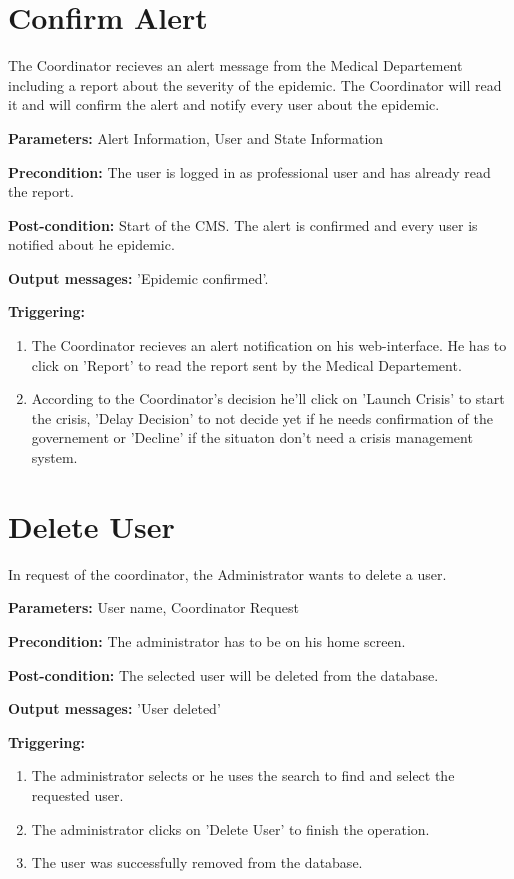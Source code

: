 \section{Confirm Alert}
\label{operation:ConfirmAlert}
The Coordinator recieves an alert message from the Medical Departement
including a report about the severity of the epidemic. The Coordinator will
read it and will confirm the alert and notify every user about the epidemic.\\
\begin{description}
\item \textbf{Parameters:} Alert Information, User and State Information
\item \textbf{Precondition:} The user is logged in as professional user and
has already read the report.
\item \textbf{Post-condition:} Start of the CMS. The alert is confirmed and
every user is notified about he epidemic.
\item \textbf{Output messages:} 'Epidemic confirmed'.
\item \textbf{Triggering:}
\begin{enumerate}
\item The Coordinator recieves an alert notification on his web-interface. He
has to click on 'Report' to read the report sent by the Medical Departement.
\item According to the Coordinator's decision he'll click on 'Launch Crisis' to
start the crisis, 'Delay Decision' to not decide yet if he needs confirmation of
the governement or 'Decline' if the situaton don't need a crisis
management system.
\end{enumerate}
\end{description}

\section{Delete User}
\label{operation:UpgradeUser}
In request of the coordinator, the Administrator wants to delete a user.\\
\begin{description}
\item \textbf{Parameters:} User name, Coordinator Request
\item \textbf{Precondition:} The administrator has to be on his home screen.
\item \textbf{Post-condition:}  The selected user will be deleted from the
database.
\item \textbf{Output messages:} 'User deleted'
\item \textbf{Triggering:}
\begin{enumerate}
\item The administrator selects or he uses the search to find and select the
requested user.
\item The administrator clicks on 'Delete User' to finish the operation.
\item The user was successfully removed from the database.
\end{enumerate}
\end{description}


